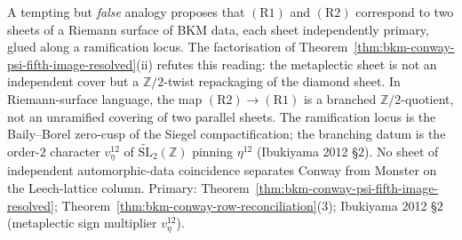 \begin{remark}
\label{rem:bkm-conway-not-riemann-sheets}
A tempting but \emph{false} analogy proposes that $(\mathrm{R1})$
and $(\mathrm{R2})$ correspond to two sheets of a Riemann surface
of BKM data, each sheet independently primary, glued along a
ramification locus. The factorisation of
Theorem~\ref{thm:bkm-conway-psi-fifth-image-resolved}\textup{(ii)}
refutes this reading: the metaplectic sheet is not an independent
cover but a $\mathbb{Z}/2$-twist repackaging of the diamond
sheet. In Riemann-surface language, the map
$(\mathrm{R2})\to(\mathrm{R1})$ is a branched $\mathbb{Z}/2$-quotient,
not an unramified covering of two parallel sheets. The
ramification locus is the Baily--Borel zero-cusp of the Siegel
compactification; the branching datum is the order-$2$ character
$v_\eta^{12}$ of $\widetilde{\mathrm{SL}}_2(\mathbb{Z})$ pinning
$\eta^{12}$ (Ibukiyama 2012 \S$2$). No sheet of independent
automorphic-data coincidence separates Conway from Monster on
the Leech-lattice column.
Primary: Theorem~\ref{thm:bkm-conway-psi-fifth-image-resolved};
Theorem~\ref{thm:bkm-conway-row-reconciliation}\textup{(3)};
Ibukiyama 2012 \S$2$ (metaplectic sign multiplier $v_\eta^{12}$).
\end{remark}

